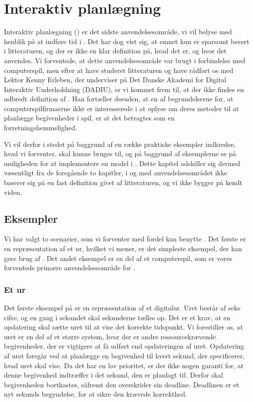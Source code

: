 \chapter{Interaktiv planlægning}
\label{chap:is}
\thispagestyle{empty}
Interaktiv planlægning (\is) er det sidste anvendelsesområde, vi vil belyse med henblik på at indføre tid i \pycsp. Det har dog vist sig, at emnet kun er sparsomt berørt i litteraturen, og der er ikke en klar definition på, hvad det er, og hvor det anvendes. 
Vi forventede, at dette anvendelsesområde var brugt i forbindelse med computerspil, men efter at have studeret litteraturen og have rådført os med Lektor Kenny Erleben, der underviser på Det Danske Akademi for Digital Interaktiv Underholdning (DADIU), er vi kommet frem til, at der ikke findes en udbredt definition af \is. Han fortæller desuden, at en af begrundelserne for, at computerspilfirmaerne ikke er interesserede i at oplyse om deres metoder til at planlægge begivenheder i spil, er at det  betragtes som en  forretningshemmelighed. 

Vi vil derfor i stedet på baggrund af en række praktiske eksempler indkredse, hvad vi forventer, \is skal kunne bruges til, og på baggrund af eksemplerne se på muligheden for at implementere en model i \pycsp. Dette kapitel adskiller sig dermed væsentligt fra de foregående to kapitler, i og med anvendelsesområdet ikke baserer sig på en fast definition givet af litteraturen, og vi ikke bygger på kendt viden.

\section{Eksempler}
Vi har valgt to scenarier, som vi forventer med fordel kan benytte \is. Det første er en repræsentation af et ur, hvilket vi mener, er det simpleste eksempel, der kan gøre brug af \is. Det andet eksempel er en del af et computerspil, som er vores forventede primære anvendelsesområde for \is. 

\subsection{Et ur}
Det første eksempel på \is er en repræsentation af et digitalur. Uret består af seks cifre, og en gang i sekundet skal sekunderne tælles op. Det er et krav, at en opdatering skal sætte uret til at vise det korrekte tidspunkt. Vi forestiller os, at uret er en del af et større system, hvor der er andre ressourcekrævende begivenheder, der er vigtigere at få udført end opdateringen af uret. Opdatering af uret foregår ved at planlægge en begivenhed til hvert sekund, der specificerer, hvad uret skal vise. Da det har en lav prioritet, er der ikke nogen garanti for, at denne begivenhed indtræffer i det sekund, den er planlagt til. Derfor skal begivenheden  bortkastes, såfremt den overskrider sin deadline. Deadlinen er et nyt sekunds begyndelse, for at sikre den krævede korrekthed. 

